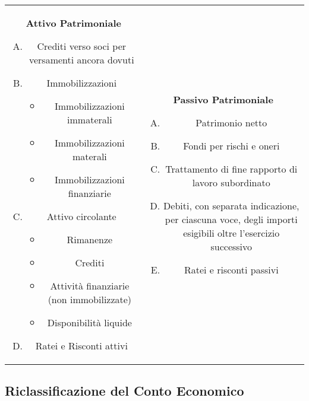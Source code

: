 \documentclass[a4paper,portrait,12pt]{article}
\theoremstyle{definition}
\begin{document}
\begin{table}
\begin{center}
\begin{tabular}{cc}
\begin{minipage}[t]{.5\linewidth}
\textbf{Attivo Patrimoniale}
\begin{enumerate}[A)]
\item Crediti verso soci per versamenti ancora dovuti
\item Immobilizzazioni
	\begin{itemize}
	\item Immobilizzazioni immaterali
	\item Immobilizzazioni materali
	\item Immobilizzazioni finanziarie
	\end{itemize}
\item Attivo circolante
	\begin{itemize}
	\item Rimanenze 
	\item Crediti
	\item Attività finanziarie (non immobilizzate)
	\item Disponibilità liquide
	\end{itemize}
\item Ratei e Risconti attivi
\end{enumerate}
\end{minipage}

&

\begin{minipage}[t]{.5\linewidth}
\textbf{Passivo Patrimoniale}
\begin{enumerate}[A)]
\item Patrimonio netto
\item Fondi per rischi e oneri
\item Trattamento di fine rapporto di lavoro subordinato
\item Debiti, con separata indicazione, per ciascuna 
voce, degli importi esigibili oltre l’esercizio successivo
\item Ratei e risconti passivi
\end{enumerate}
\end{minipage}
\end{tabular}
\end{center}
\end{table}

\subsection{Riclassificazione del Conto Economico}
\end{document}
